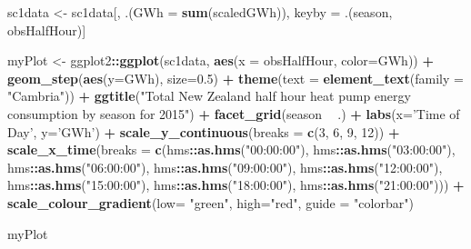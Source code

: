 \documentclass[]{article}
\newenvironment{Shaded}{\begin{snugshade}}{\end{snugshade}}
\newcommand{\KeywordTok}[1]{\textcolor[rgb]{0.13,0.29,0.53}{\textbf{#1}}}
\newcommand{\DataTypeTok}[1]{\textcolor[rgb]{0.13,0.29,0.53}{#1}}
\newcommand{\DecValTok}[1]{\textcolor[rgb]{0.00,0.00,0.81}{#1}}
\newcommand{\FloatTok}[1]{\textcolor[rgb]{0.00,0.00,0.81}{#1}}
\newcommand{\StringTok}[1]{\textcolor[rgb]{0.31,0.60,0.02}{#1}}
\newcommand{\OperatorTok}[1]{\textcolor[rgb]{0.81,0.36,0.00}{\textbf{#1}}}
\newcommand{\NormalTok}[1]{#1}
\theoremstyle{definition}
\theoremstyle{definition}
\theoremstyle{definition}
\theoremstyle{remark}
\begin{document}
\begin{Shaded}
\begin{Highlighting}[]
\NormalTok{sc1data <-}\StringTok{ }\NormalTok{sc1data[, .(}\DataTypeTok{GWh =} \KeywordTok{sum}\NormalTok{(scaledGWh)), }
\NormalTok{                    keyby =}\StringTok{ }\NormalTok{.(season, obsHalfHour)]}

\NormalTok{myPlot <-}\StringTok{ }\NormalTok{ggplot2}\OperatorTok{::}\KeywordTok{ggplot}\NormalTok{(sc1data, }\KeywordTok{aes}\NormalTok{(}\DataTypeTok{x =}\NormalTok{ obsHalfHour, }\DataTypeTok{color=}\NormalTok{GWh)) }\OperatorTok{+}
\StringTok{  }\KeywordTok{geom_step}\NormalTok{(}\KeywordTok{aes}\NormalTok{(}\DataTypeTok{y=}\NormalTok{GWh), }\DataTypeTok{size=}\FloatTok{0.5}\NormalTok{) }\OperatorTok{+}
\StringTok{  }\KeywordTok{theme}\NormalTok{(}\DataTypeTok{text =} \KeywordTok{element_text}\NormalTok{(}\DataTypeTok{family =} \StringTok{"Cambria"}\NormalTok{)) }\OperatorTok{+}
\StringTok{  }\KeywordTok{ggtitle}\NormalTok{(}\StringTok{"Total New Zealand half hour heat pump energy consumption by season for 2015"}\NormalTok{) }\OperatorTok{+}
\StringTok{  }\KeywordTok{facet_grid}\NormalTok{(season }\OperatorTok{~}\StringTok{ }\NormalTok{.) }\OperatorTok{+}
\StringTok{  }\KeywordTok{labs}\NormalTok{(}\DataTypeTok{x=}\StringTok{'Time of Day'}\NormalTok{, }\DataTypeTok{y=}\StringTok{'GWh'}\NormalTok{) }\OperatorTok{+}
\StringTok{  }\KeywordTok{scale_y_continuous}\NormalTok{(}\DataTypeTok{breaks =} \KeywordTok{c}\NormalTok{(}\DecValTok{3}\NormalTok{, }\DecValTok{6}\NormalTok{, }\DecValTok{9}\NormalTok{, }\DecValTok{12}\NormalTok{)) }\OperatorTok{+}
\StringTok{  }\KeywordTok{scale_x_time}\NormalTok{(}\DataTypeTok{breaks =} \KeywordTok{c}\NormalTok{(hms}\OperatorTok{::}\KeywordTok{as.hms}\NormalTok{(}\StringTok{"00:00:00"}\NormalTok{), hms}\OperatorTok{::}\KeywordTok{as.hms}\NormalTok{(}\StringTok{"03:00:00"}\NormalTok{), hms}\OperatorTok{::}\KeywordTok{as.hms}\NormalTok{(}\StringTok{"06:00:00"}\NormalTok{),       hms}\OperatorTok{::}\KeywordTok{as.hms}\NormalTok{(}\StringTok{"09:00:00"}\NormalTok{), hms}\OperatorTok{::}\KeywordTok{as.hms}\NormalTok{(}\StringTok{"12:00:00"}\NormalTok{), }
\NormalTok{  hms}\OperatorTok{::}\KeywordTok{as.hms}\NormalTok{(}\StringTok{"15:00:00"}\NormalTok{), hms}\OperatorTok{::}\KeywordTok{as.hms}\NormalTok{(}\StringTok{"18:00:00"}\NormalTok{), hms}\OperatorTok{::}\KeywordTok{as.hms}\NormalTok{(}\StringTok{"21:00:00"}\NormalTok{))) }\OperatorTok{+}
\StringTok{  }\KeywordTok{scale_colour_gradient}\NormalTok{(}\DataTypeTok{low=} \StringTok{"green"}\NormalTok{, }\DataTypeTok{high=}\StringTok{"red"}\NormalTok{, }\DataTypeTok{guide =} \StringTok{"colorbar"}\NormalTok{)}

\NormalTok{myPlot}
\end{Highlighting}
\end{Shaded}
\end{document}
